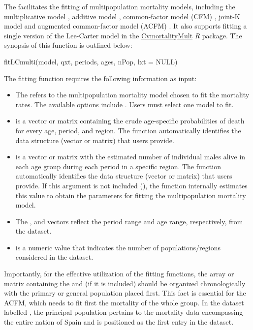 The  facilitates the fitting of multipopulation mortality models, including the multiplicative model \citep{Russolillo2011}, additive model \citep{Debon2011}, common-factor model (CFM) \citep{Carter1992}, joint-K model \citep{Carter1992} and augmented common-factor model (ACFM) \citep{Li2005}. It also supports fitting a single version of the Lee-Carter model \citep{Lee1992} in the \href{https://cran.r-project.org/web/packages/CvmortalityMult/index.html}{CvmortalityMult} \emph{R} package. The synopsis of this function is outlined below:
\begin{example}
fitLCmulti(model, qxt, periods, ages, nPop, lxt = NULL)
\end{example}
The fitting function requires the following information as input:
\begin{itemize}
\item The  refers to the multipopulation mortality model chosen to fit the mortality rates. The available options include . Users must select one model to fit.
\item {} is a vector or matrix containing the crude age-specific probabilities of death for every age, period, and region. The function automatically identifies the data structure (vector or matrix) that users provide.
\item {} is a vector or matrix with the estimated number of individual males alive in each age group during each period in a specific region. The function automatically identifies the data structure (vector or matrix) that users provide. If this argument is not included (), the function internally estimates this value to obtain the parameters for fitting the multipopulation mortality model.
\item The , and  vectors reflect the period range and age range, respectively, from the dataset.
\item {} is a numeric value that indicates the number of populations/regions considered in the dataset.
\end{itemize}
Importantly, for the effective utilization of the fitting functions, the array or matrix containing the  and  (if it is included) should be organized chronologically with the primary or general population placed first. This fact is essential for the ACFM, which needs to fit first the mortality of the whole group. In the dataset labelled , the principal population pertains to the mortality data encompassing the entire nation of Spain and is positioned as the first entry in the dataset.

